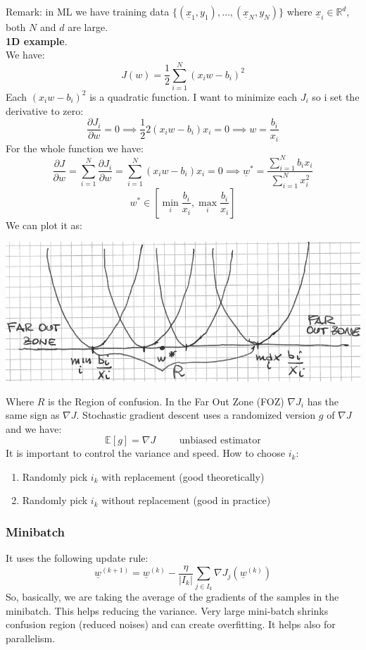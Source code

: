 Remark: in ML we have training data $\{(\underline{x}_1, y_1), \dots, (\underline{x}_N, y_N)\}$ where $\underline{x}_i \in \mathbb{R}^d$, both $N$ and $d$ are large. \\

\textbf{1D example}.\\
We have:
\[
    J(w) = \dfrac{1}{2}\sum_{i=1}^N \left(x_i w - b_i\right)^2   
\]
Each $\left(x_i w - b_i\right)^2$ is a quadratic function. I want to minimize each $J_i$ so i set the derivative to zero:
\[
    \dfrac{\partial J_i}{\partial w} = 0 \implies \dfrac{1}{2}2\left(x_i w - b_i\right)x_i = 0 \implies w = \dfrac{b_i}{x_i}
\]
For the whole function we have:
\[
    \dfrac{\partial J}{\partial w} = \sum_{i=1}^N \dfrac{\partial J_i}{\partial w} = \sum_{i=1}^N \left(x_i w - b_i\right)x_i = 0 \implies \underline{w}^* = \dfrac{\sum_{i=1}^N b_i x_i}{\sum_{i=1}^N x_i^2}    
\]
\[
  w^* \in \left[\min_i \dfrac{b_i}{x_i}, \max_i \dfrac{b_i}{x_i}\right]  
\]
We can plot it as:
\begin{center}
    \includegraphics[scale=0.3]{../images/SGD.png}
\end{center}
Where $R$ is the Region of confusion. In the Far Out Zone (FOZ) $\nabla J_i$ has the same sign as $\nabla J$. Stochastic gradient descent uses a randomized version $g$ of $\nabla J$ and we have:
\[
    \mathbb{E}[g] = \nabla J \hspace{1cm} \text{unbiased estimator}     
\]
It is important to control the variance and speed. How to choose $i_k$:
\begin{enumerate}
    \item Randomly pick $i_k$ with replacement (good theoretically)
    \item Randomly pick $i_k$ without replacement (good in practice)
\end{enumerate}

\subsubsection{Minibatch}
It uses the following update rule:
\[
    \underline{w}^{(k+1)} = \underline{w}^{(k)} - \dfrac{\eta}{\vert I_k\vert} \sum_{j \in I_k} \nabla J_j(\underline{w}^{(k)})
\]
So, basically, we are taking the average of the gradients of the samples in the minibatch. This helps reducing the variance. Very large mini-batch shrinks confusion region (reduced noises) and can create overfitting. It helps also for parallelism. 